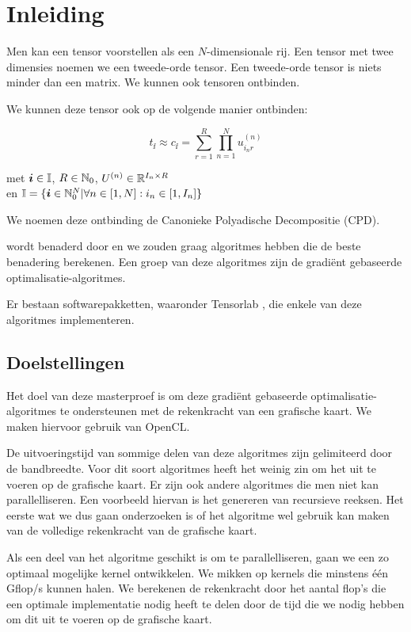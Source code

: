 \chapter{Inleiding}
\label{inleiding}
Men kan een tensor voorstellen als een $N$-dimensionale rij. Een tensor met twee dimensies noemen we een tweede-orde tensor. Een tweede-orde tensor is niets minder dan een matrix. We kunnen ook tensoren ontbinden.

We kunnen deze tensor ook op de volgende manier ontbinden:

\[
    t_{\ii{}} \approx c_{\ii{}} = \sum_{r=1}^{R} \prod_{n=1}^{N} u^{(n)}_{i_{n}r}
\]
\begin{center}
met $\boldsymbol{i}{} \in \mathbb{I}$, $R \in \mathbb{N}_0$, $U^{(n)} \in \mathbb{R}^{I_n \times R}$ \\ en $ \mathbb{I} = \{\boldsymbol{i}{} \in \mathbb{N}_0^N | \forall n \in [1, N]: i_n \in [1, I_n]\}$
\end{center}

We noemen deze ontbinding de Canonieke Polyadische Decompositie (CPD).

\TT{} wordt benaderd door \CC{} en we zouden graag algoritmes hebben die de beste benadering berekenen. Een groep van deze algoritmes zijn de gradi\"ent gebaseerde optimalisatie-algoritmes. 

Er bestaan softwarepakketten, waaronder Tensorlab \cite{tensorlab}, die enkele  van deze algoritmes implementeren.

\section{Doelstellingen}

Het doel van deze masterproef is om deze gradi\"ent gebaseerde optimalisatie-algoritmes te ondersteunen met de rekenkracht van een grafische kaart. We maken hiervoor gebruik van OpenCL. 

De uitvoeringstijd van sommige delen van deze algoritmes zijn gelimiteerd door de bandbreedte. Voor dit soort algoritmes heeft het weinig zin om het uit te voeren op de grafische kaart. Er zijn ook andere algoritmes die men niet kan parallelliseren. Een voorbeeld hiervan is het genereren van recursieve reeksen. Het eerste wat we dus gaan onderzoeken is of het algoritme wel gebruik kan maken van de volledige rekenkracht van de grafische kaart.

Als een deel van het algoritme geschikt is om te parallelliseren, gaan we een zo optimaal mogelijke kernel ontwikkelen. We mikken op kernels die minstens \'e\'en Gflop/s kunnen halen. We berekenen de rekenkracht door het aantal flop's die een optimale implementatie nodig heeft te delen door de tijd die we nodig hebben om dit uit te voeren op de grafische kaart.

